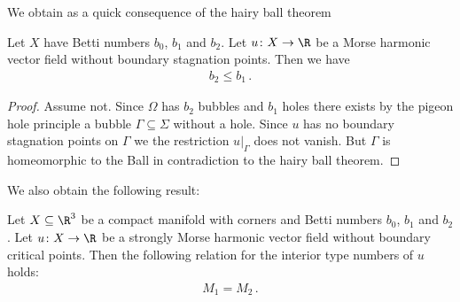 We obtain as a quick consequence of the hairy ball theorem
\begin{proposition}
  Let $X$ have Betti numbers $b_0$, $b_1$ and $b_2$.
  Let $u\colon X\to\R$
  be a Morse harmonic vector field without boundary stagnation points. Then we have
  \begin{align*}
    b_2\leq b_1\,.
  \end{align*}
\end{proposition}
\begin{proof} 
  Assume not. Since $\Omega$ has $b_2$ bubbles and $b_1$ holes there exists by the pigeon hole
  principle a bubble $\Gamma\subseteq\Sigma$ without a hole. Since $u$ has no boundary stagnation points on $\Gamma$ we
  the restriction $u\vert_\Gamma$ does not vanish. But $\Gamma$ is homeomorphic to the Ball in contradiction to the hairy ball theorem.
\end{proof}
We also obtain the following result:
\begin{proposition}
  Let $X\subseteq\R^3$ be a compact manifold with corners and Betti numbers $b_0$, $b_1$ and $b_2$.
  Let $u\colon X\to\R$ be a strongly Morse harmonic vector field without boundary critical points.
  Then the following relation for
  the interior type numbers of $u$ holds:
  \begin{align*}
    M_1=M_2\,.
  \end{align*}
\end{proposition}
